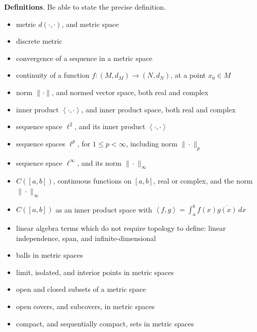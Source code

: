 \documentclass[12pt]{amsart}
\newcommand{\bigspacing}{\renewcommand{\baselinestretch}{1.21}\tiny\normalsize}
\newcommand{\ip}[2]{\left<#1,#2\right>}
\begin{document}
\bigspacing
\noindent \textbf{Definitions}.  Be able to state the precise definition.
\begin{itemize}
\item metric $d(\cdot,\cdot)$, and metric space
\item discrete metric
\item convergence of a sequence in a metric space
\item continuity of a function $f:(M,d_M) \to (N,d_N)$, at a point $x_0\in M$
\item norm $\|\cdot\|$, and normed vector space, both real and complex
\item inner product $\ip{\cdot}{\cdot}$, and inner product space, both real and complex
\item sequence space $\ell^2$, and its inner product $\ip{\cdot}{\cdot}$
\item sequence spaces $\ell^p$, for $1\le p < \infty$, including norm $\|\cdot\|_p$
\item sequence space $\ell^\infty$, and its norm $\|\cdot\|_\infty$
\item $C([a,b])$, continuous functions on $[a,b]$, real or complex, and the norm $\|\cdot\|_\infty$
\item $C([a,b])$ as an inner product space with $\ip{f}{g}=\int_a^b f(x) \overline{g(x)}\,dx$
\item linear algebra terms which do not require topology to define: linear independence, span, and infinite-dimensional
\item balls in metric spaces
\item limit, isolated, and interior points in metric spaces
\item open and closed subsets of a metric space
\item open covers, and subcovers, in metric spaces
\item compact, and sequentially compact, sets in metric spaces


\end{itemize}
\end{document}
